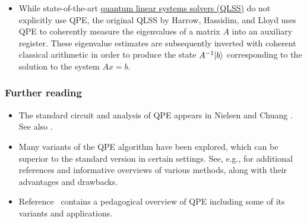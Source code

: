 \begin{refsection}
\begin{itemize}
    \item While state-of-the-art \hyperref[prim:QuantumLinearSystemSolvers]{quantum linear systems solvers (QLSS)} do not explicitly use QPE, the original QLSS by Harrow, Hassidim, and Lloyd \cite{harrow2009QLinSysSolver} uses QPE to coherently measure the eigenvalues of a matrix $A$ into an auxiliary register. These eigenvalue estimates are subsequently inverted with coherent classical arithmetic in order to produce the state $A^{-1}\lvert b\rangle$ corresponding to the solution to the system $Ax=b$. 
\end{itemize}


\subsubsection*{Further reading}

\begin{itemize}
    \item The standard circuit and analysis of QPE appears in Nielsen and Chuang \cite{nielsen2002QCQI}. See also \cite{cleve1997QAlgsRevisited}.
    \item Many variants of the QPE algorithm have been explored, which can be superior to the standard version in certain settings. See, e.g., \cite{Rall2021fastercoherent,lin2022HeisenbergLimited} for additional references and informative overviews of various methods, along with their advantages and drawbacks. 
    \item Reference~\cite{lin2022LectureNotes} contains a pedagogical overview of QPE including some of its variants and applications. 
\end{itemize}
\printbibliography[heading=secbib,segment=\therefsegment]

\end{refsection}